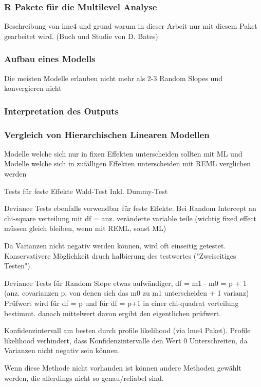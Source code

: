 \documentclass[12pt]{article}\usepackage[]{graphicx}\usepackage[]{color}
\numberwithin{equation}{section}
\begin{document}
\subsubsection{R Pakete für die Multilevel Analyse}
Beschreibung von lme4 und grund warum in dieser Arbeit nur mit diesem Paket gearbeitet wird. (Buch und Studie von D. Bates)
\subsubsection{Aufbau eines Modells}
Die meisten Modelle erlauben nicht mehr als 2-3 Random Slopes und konvergieren nicht \citep{SnijdersTomA.B2012Ma:a}
\subsubsection{Interpretation des Outputs}

\subsubsection{Vergleich von Hierarchischen Linearen Modellen}
Modelle welche sich nur in fixen Effekten unterscheiden sollten mit ML und Modelle welche sich in zufälligen Effekten unterscheiden mit REML verglichen werden \cite{SnijdersTomA.B2012Ma:a}

Tests für feste Effekte Wald-Test \cite{SnijdersTomA.B2012Ma:a} Inkl. Dummy-Test

Deviance Tests ebenfalls verwendbar für feste Effekte. Bei Random Intercept an chi-square verteilung mit df = anz. veränderte variable teile (wichtig fixed effect müssen gleich bleiben, wenn mit REML, sonst ML)

Da Varianzen nicht negativ werden können, wird oft einseitig getestet. Konservativere Möglichkeit druch halbierung des testwertes ("Zweiseitiges Testen").


Deviance Tests für Random Slope etwas aufwändiger, df = m1 - m0 = p + 1 (anz. covarianzen p, von denen sich das m0 zu m1 unterscheiden + 1 varianz) Prüfwert wird für df = p und für df = p+1 in einer chi-quadrat verteilung bestimmt. danach mittelwert davon ergibt den eigentlichen prüfwert. 

Konfidenzintervall am besten durch profile likelihood (via lme4 Paket). Profile likelihood verhindert, dass Konfidenzintervalle den Wert 0 Unterschreiten, da Varianzen nicht negativ sein können. 

Wenn diese Methode nicht vorhanden ist können andere Methoden gewählt werden, die allerdings nicht so genau/reliabel sind.
\end{document}
